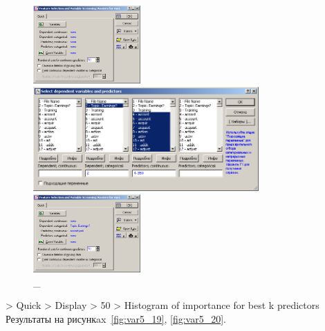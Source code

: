 \begin{figure}[!h]
  \centering

  \begin{minipage}{0.22\textwidth}
    \centering

    \includegraphics[height=3cm]
    {inc/var5/16.PNG}

    \caption{\_}

    \label{fig:var5_16}
  \end{minipage}
  \begin{minipage}{0.52\textwidth}
    \centering

    \includegraphics[height=4cm]
    {inc/var5/17.PNG}

    \caption{\_}

    \label{fig:var5_17}
  \end{minipage}
  \begin{minipage}{0.22\textwidth}
    \centering

    \includegraphics[height=3cm]
    {inc/var5/18.PNG}

    \caption{\_}

    \label{fig:var5_18}
  \end{minipage}
\end{figure}

> Quick > Display > 50 > Histogram of importance for best k predictors \\

Результаты на рисункax~\ref{fig:var5_19}, \ref{fig:var5_20}.


